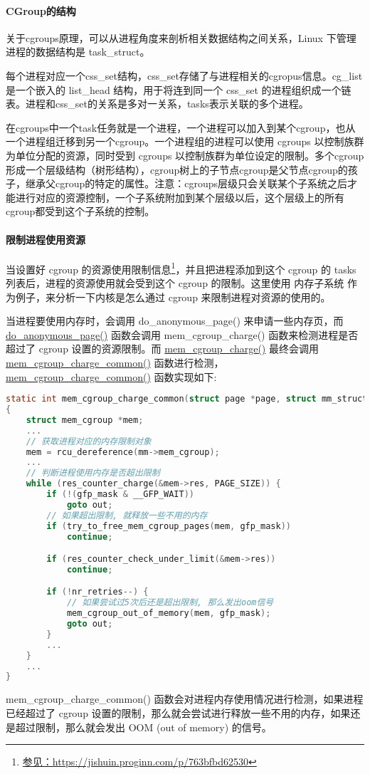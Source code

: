 \documentclass[../../../interview-questions.tex]{subfiles}
\begin{document}
\paragraph{CGroup的结构}

关于cgroups原理，可以从进程角度来剖析相关数据结构之间关系，Linux 下管理进程的数据结构是 task\_struct。

每个进程对应一个css\_set结构，css\_set存储了与进程相关的cgropus信息。cg\_list是一个嵌入的 list\_head 结构，用于将连到同一个 css\_set 的进程组织成一个链表。进程和css\_set的关系是多对一关系，tasks表示关联的多个进程。

在cgroups中一个task任务就是一个进程，一个进程可以加入到某个cgroup，也从一个进程组迁移到另一个cgroup。一个进程组的进程可以使用 cgroups 以控制族群为单位分配的资源，同时受到 cgroups 以控制族群为单位设定的限制。多个cgroup形成一个层级结构（树形结构），cgroup树上的子节点cgroup是父节点cgroup的孩子，继承父cgroup的特定的属性。注意：cgroups层级只会关联某个子系统之后才能进行对应的资源控制，一个子系统附加到某个层级以后，这个层级上的所有cgroup都受到这个子系统的控制。

\paragraph{限制进程使用资源}

当设置好 cgroup 的资源使用限制信息\footnote{\url{参见：https://jishuin.proginn.com/p/763bfbd62530}}，并且把进程添加到这个 cgroup 的 tasks 列表后，进程的资源使用就会受到这个 cgroup 的限制。这里使用 内存子系统 作为例子，来分析一下内核是怎么通过 cgroup 来限制进程对资源的使用的。

当进程要使用内存时，会调用 do\_anonymous\_page() 来申请一些内存页，而 \url{do\_anonymous\_page()} 函数会调用 mem\_cgroup\_charge() 函数来检测进程是否超过了 cgroup 设置的资源限制。而 \url{mem\_cgroup\_charge()} 最终会调用 \url{mem\_cgroup\_charge\_common()} 函数进行检测，\url{mem\_cgroup\_charge\_common()} 函数实现如下:

\begin{lstlisting}[language=C]
static int mem_cgroup_charge_common(struct page *page, struct mm_struct *mm, gfp_t gfp_mask, enum charge_type ctype)
{
    struct mem_cgroup *mem;
    ...
    // 获取进程对应的内存限制对象
    mem = rcu_dereference(mm->mem_cgroup); 
    ...
    // 判断进程使用内存是否超出限制
    while (res_counter_charge(&mem->res, PAGE_SIZE)) { 
        if (!(gfp_mask & __GFP_WAIT))
            goto out;
        // 如果超出限制, 就释放一些不用的内存
        if (try_to_free_mem_cgroup_pages(mem, gfp_mask)) 
            continue;

        if (res_counter_check_under_limit(&mem->res))
            continue;

        if (!nr_retries--) {
            // 如果尝试过5次后还是超出限制, 那么发出oom信号
            mem_cgroup_out_of_memory(mem, gfp_mask); 
            goto out;
        }
        ...
    }
    ...
}
\end{lstlisting}

mem\_cgroup\_charge\_common() 函数会对进程内存使用情况进行检测，如果进程已经超过了 cgroup 设置的限制，那么就会尝试进行释放一些不用的内存，如果还是超过限制，那么就会发出 OOM (out of memory) 的信号。
\end{document}
